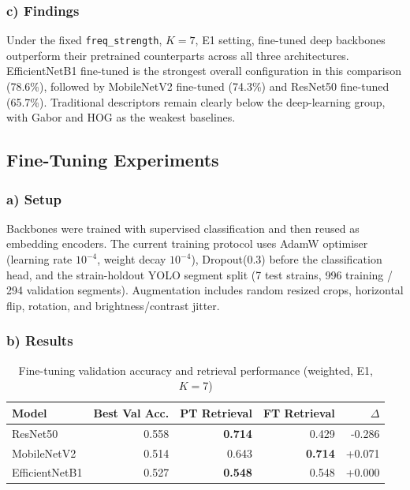 \subsubsection{c) Findings}

Under the fixed \texttt{freq\_strength}, $K=7$, E1 setting, fine-tuned deep backbones outperform their pretrained counterparts across all three architectures. EfficientNetB1 fine-tuned is the strongest overall configuration in this comparison (78.6\%), followed by MobileNetV2 fine-tuned (74.3\%) and ResNet50 fine-tuned (65.7\%). Traditional descriptors remain clearly below the deep-learning group, with Gabor and HOG as the weakest baselines.

\subsection{Fine-Tuning Experiments}\label{fine-tuning-experiments}

\subsubsection{a) Setup}

Backbones were trained with supervised classification and then reused as embedding encoders. The current training protocol uses AdamW optimiser (learning rate $10^{-4}$, weight decay $10^{-4}$), Dropout(0.3) before the classification head, and the strain-holdout YOLO segment split (7 test strains, 996 training / 294 validation segments). Augmentation includes random resized crops, horizontal flip, rotation, and brightness/contrast jitter.

\subsubsection{b) Results}

\begin{table}[ht]
\centering
\caption{Fine-tuning validation accuracy and retrieval performance (weighted, E1, $K=7$)}
\begin{tabularx}{\textwidth}{@{}lrrrr@{}}
\toprule
\textbf{Model} & \textbf{Best Val Acc.} & \textbf{PT Retrieval} & \textbf{FT Retrieval} & \textbf{$\Delta$} \\
\midrule
ResNet50       & 0.558 & \textbf{0.714} & 0.429 & -0.286 \\
MobileNetV2    & 0.514 & 0.643 & \textbf{0.714} & +0.071 \\
EfficientNetB1 & 0.527 & \textbf{0.548} & 0.548 & +0.000 \\
\bottomrule
\end{tabularx}
\label{tab:finetune-results}
\end{table}

